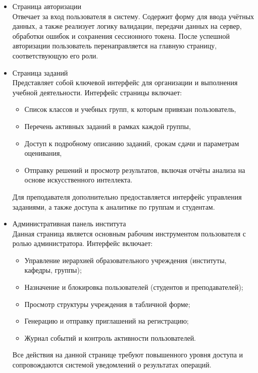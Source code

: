 \begin{itemize}
  \item Страница авторизации\\
  Отвечает за вход пользователя в систему. Содержит форму для ввода учётных данных, а также реализует логику валидации, передачи данных на сервер, обработки ошибок и сохранения сессионного токена. После успешной авторизации пользователь перенаправляется на главную страницу, соответствующую его роли.

  \item Страница заданий\\
  Представляет собой ключевой интерфейс для организации и выполнения учебной деятельности. Интерфейс страницы включает:
  \begin{itemize}
    \item Список классов и учебных групп, к которым привязан пользователь,
    \item Перечень активных заданий в рамках каждой группы,
    \item Доступ к подробному описанию заданий, срокам сдачи и параметрам оценивания,
    \item Отправку решений и просмотр результатов, включая отчёты анализа на основе искусственного интеллекта.
  \end{itemize}
  Для преподавателя дополнительно предоставляется интерфейс управления заданиями, а также доступа к аналитике по группам и студентам.

  \item Административная панель института\\
  Данная страница является основным рабочим инструментом пользователя с ролью администратора. Интерфейс включает:
  \begin{itemize}
    \item Управление иерархией образовательного учреждения (институты, кафедры, группы);
    \item Назначение и блокировка пользователей (студентов и преподавателей);
    \item Просмотр структуры учреждения в табличной форме;
    \item Генерацию и отправку приглашений на регистрацию;
    \item Журнал событий и контроль активности пользователей.
  \end{itemize}
  Все действия на данной странице требуют повышенного уровня доступа и сопровождаются системой уведомлений о результатах операций.


\end{itemize}
